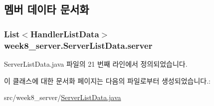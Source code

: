 \subsection{멤버 데이타 문서화}
\hypertarget{classweek8__server_1_1_server_list_data_a732d8343a7bb9f2afd473a397a9937aa}{
\subsubsection[{server}]{\setlength{\rightskip}{0pt plus 5cm}List$<${\bf Handler\-List\-Data}$>$ week8\-\_\-server.\-Server\-List\-Data.\-server\hspace{0.3cm}{\ttfamily [private]}}}\label{classweek8__server_1_1_server_list_data_a732d8343a7bb9f2afd473a397a9937aa}


Server\-List\-Data.\-java 파일의 21 번째 라인에서 정의되었습니다.



이 클래스에 대한 문서화 페이지는 다음의 파일로부터 생성되었습니다.\-:\begin{DoxyCompactItemize}
\item 
src/week8\-\_\-server/\hyperlink{_server_list_data_8java}{Server\-List\-Data.\-java}\end{DoxyCompactItemize}
